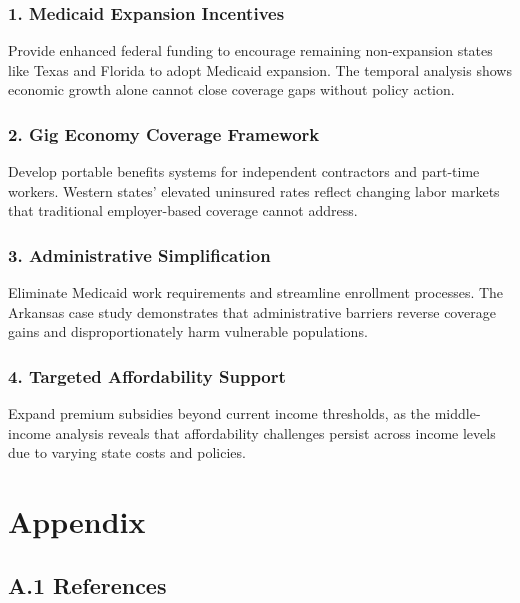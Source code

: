 \documentclass[
]{article}
\begin{document}
\subsubsection{1. Medicaid Expansion
Incentives}\label{medicaid-expansion-incentives}

Provide enhanced federal funding to encourage remaining non-expansion
states like Texas and Florida to adopt Medicaid expansion. The temporal
analysis shows economic growth alone cannot close coverage gaps without
policy action.

\subsubsection{2. Gig Economy Coverage
Framework}\label{gig-economy-coverage-framework}

Develop portable benefits systems for independent contractors and
part-time workers. Western states' elevated uninsured rates reflect
changing labor markets that traditional employer-based coverage cannot
address.

\subsubsection{3. Administrative
Simplification}\label{administrative-simplification}

Eliminate Medicaid work requirements and streamline enrollment
processes. The Arkansas case study demonstrates that administrative
barriers reverse coverage gains and disproportionately harm vulnerable
populations.

\subsubsection{4. Targeted Affordability
Support}\label{targeted-affordability-support}

Expand premium subsidies beyond current income thresholds, as the
middle-income analysis reveals that affordability challenges persist
across income levels due to varying state costs and policies.

\section{Appendix}\label{appendix}

\subsection{A.1 References}\label{a.1-references}
\end{document}
